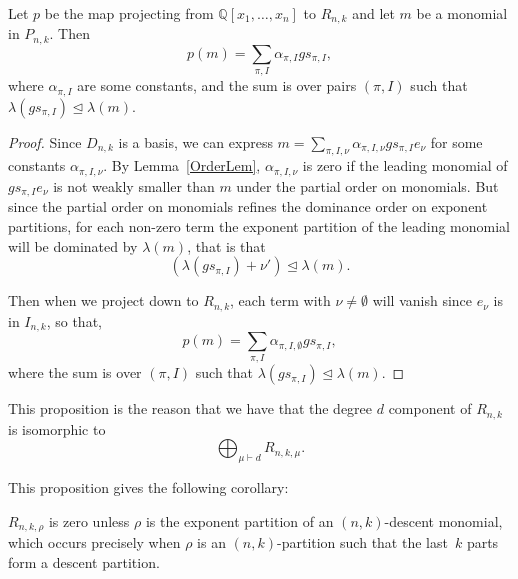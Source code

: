 \documentclass[ALCO,ThmDefs,Unicode,epreuves]{cedram}
\begin{document}
\begin{prop}
\label{DomProp}
	Let $p$ be the map projecting from $\mathbb{Q}[x_1,\ldots, x_n]$ to $R_{n,k}$ and let $m$ be a monomial in $P_{n,k}$. Then 
		\begin{equation}
p(m)=\sum_{\pi,I} \alpha_{\pi,I} gs_{\pi,I},
\end{equation}
	 where $\alpha_{\pi,I}$ are some constants, and the sum is over pairs $(\pi,I)$ such that 
$\lambda(gs_{\pi,I})\trianglelefteq \lambda(m)$.

	\begin{proof}
		Since $D_{n,k}$ is a basis, we can express $m=\sum_{\pi,I,\nu} \alpha_{\pi,I,\nu} gs_{\pi,I} e_\nu$ for some constants 
$\alpha_{\pi,I,\nu}$. By Lemma~\ref{OrderLem}, $\alpha_{\pi,I,\nu}$ is zero if the leading monomial of $gs_{\pi,I} 
e_\nu$ is not weakly smaller than $m$ under the partial order on monomials. But since the partial order on monomials 
refines the dominance order on exponent partitions, for each non-zero term the exponent partition of the leading 
monomial will be dominated by $\lambda(m)$, that is that 
		\begin{equation}
(\lambda(gs_{\pi,I})+\nu')\trianglelefteq \lambda(m).
\end{equation}

	 Then when we project down to $R_{n,k}$, each term with $\nu\neq \emptyset$ will vanish since $e_\nu$ is in $I_{n,k}$, so 
that, 
		\begin{equation}
p(m)=\sum_{\pi,I}\alpha_{\pi,I,\emptyset} gs_{\pi,I},
\end{equation}
 where the sum is over $(\pi,I)$ such that $\lambda(gs_{\pi,I})\trianglelefteq \lambda(m)$.
	\end{proof}
\end{prop}

This proposition is the reason that we have that the degree $d$ component of $R_{n,k}$ is isomorphic to 
\begin{equation}
\bigoplus_{\mu\vdash d} R_{n,k,\mu}.
\end{equation}


This proposition gives the following corollary:

\begin{coro}
\label{zero}

	$R_{n,k,\rho}$ is zero unless $\rho$ is the exponent partition of an $(n,k)$-descent monomial, which occurs precisely when 
$\rho$ is an $(n,k)$-partition such that the last~$k$ parts form a descent partition.

\end{coro}
\end{document}
